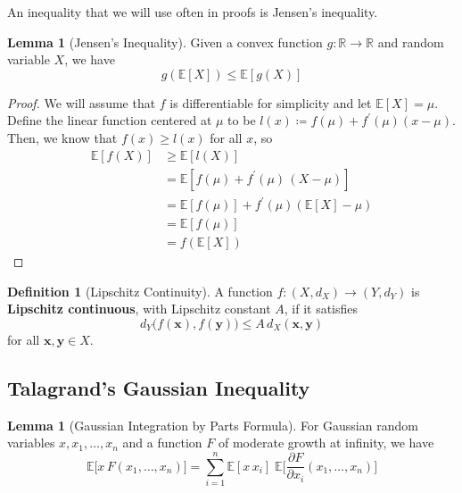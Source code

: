 \documentclass{article}
\theoremstyle{definition}
\newtheorem{lemma}[theorem]{Lemma}
\theoremstyle{remark}
\theoremstyle{definition}
\newtheorem{definition}{Definition}[section]
\begin{document}
An inequality that we will use often in proofs is Jensen's inequality. 

\begin{lemma}[Jensen's Inequality]
Given a convex function $g: \mathbb{R} \rightarrow \mathbb{R}$ and random variable $X$, we have 
\[g(\mathbb{E}[X]) \leq \mathbb{E}[g(X)]\]
\end{lemma}
\begin{proof}
We will assume that $f$ is differentiable for simplicity and let $\mathbb{E}[X] = \mu$. Define the linear function centered at $\mu$ to be $l(x) \coloneqq f(\mu) + f^\prime (\mu) (x - \mu)$. Then, we know that $f(x) \geq l(x)$ for all $x$, so 
\begin{align*}
    \mathbb{E}[f(X)] & \geq \mathbb{E}[ l(X)] \\ 
    & = \mathbb{E}[f(\mu) + f^\prime (\mu) \, (X - \mu)] \\
    & = \mathbb{E}[f(\mu)] + f^\prime (\mu) ( \mathbb{E}[X] - \mu) \\
    & = \mathbb{E}[f(\mu)] \\
    & = f(\mathbb{E}[X])
\end{align*}
\end{proof}

\begin{definition}[Lipschitz Continuity]
A function $f: (X, d_X) \longrightarrow (Y, d_Y)$ is \textbf{Lipschitz continuous}, with Lipschitz constant $A$, if it satisfies 
\[d_Y \big( f(\mathbf{x}), f(\mathbf{y})\big) \leq A \, d_X (\mathbf{x}, \mathbf{y})\]
for all $\mathbf{x}, \mathbf{y} \in X$. 
\end{definition}

\subsection{Talagrand's Gaussian Inequality}

\begin{lemma}[Gaussian Integration by Parts Formula]
For Gaussian random variables $x, x_1, \ldots, x_n$ and a function $F$ of moderate growth at infinity, we have 
\[\mathbb{E}\big[ x \, F(x_1, \ldots, x_n) \big] = \sum_{i=1}^n \mathbb{E}[x \, x_i] \; \mathbb{E}\bigg[ \frac{\partial F}{\partial x_i} (x_1, \ldots, x_n) \bigg]\]
\end{lemma}
\end{document}
